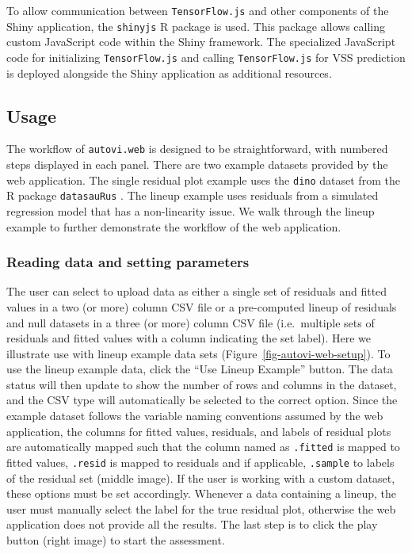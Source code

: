 \documentclass[
doublespace,
  times]{anzsauth}
\begin{document}
To allow communication between \texttt{TensorFlow.js} and other
components of the Shiny application, the \texttt{shinyjs} R package
\citep{shinyjs} is used. This package allows calling custom JavaScript
code within the Shiny framework. The specialized JavaScript code for
initializing \texttt{TensorFlow.js} and calling \texttt{TensorFlow.js}
for VSS prediction is deployed alongside the Shiny application as
additional resources.

\subsection{Usage}\label{sec-autovi-web-workflow}

The workflow of \texttt{autovi.web} is designed to be straightforward,
with numbered steps displayed in each panel. There are two example
datasets provided by the web application. The single residual plot
example uses the \texttt{dino} dataset from the R package
\texttt{datasauRus} \citep{datasaurus}. The lineup example uses
residuals from a simulated regression model that has a non-linearity
issue. We walk through the lineup example to further demonstrate the
workflow of the web application.

\subsubsection{Reading data and setting
parameters}\label{reading-data-and-setting-parameters}

The user can select to upload data as either a single set of residuals
and fitted values in a two (or more) column CSV file or a pre-computed
lineup of residuals and null datasets in a three (or more) column CSV
file (i.e.~multiple sets of residuals and fitted values with a column
indicating the set label). Here we illustrate use with lineup example
data sets (Figure~\ref{fig-autovi-web-setup}). To use the lineup example
data, click the ``Use Lineup Example'' button. The data status will then
update to show the number of rows and columns in the dataset, and the
CSV type will automatically be selected to the correct option. Since the
example dataset follows the variable naming conventions assumed by the
web application, the columns for fitted values, residuals, and labels of
residual plots are automatically mapped such that the column named as
\texttt{.fitted} is mapped to fitted values, \texttt{.resid} is mapped
to residuals and if applicable, \texttt{.sample} to labels of the
residual set (middle image). If the user is working with a custom
dataset, these options must be set accordingly. Whenever a data
containing a lineup, the user must manually select the label for the
true residual plot, otherwise the web application does not provide all
the results. The last step is to click the play button (right image) to
start the assessment.
\end{document}

